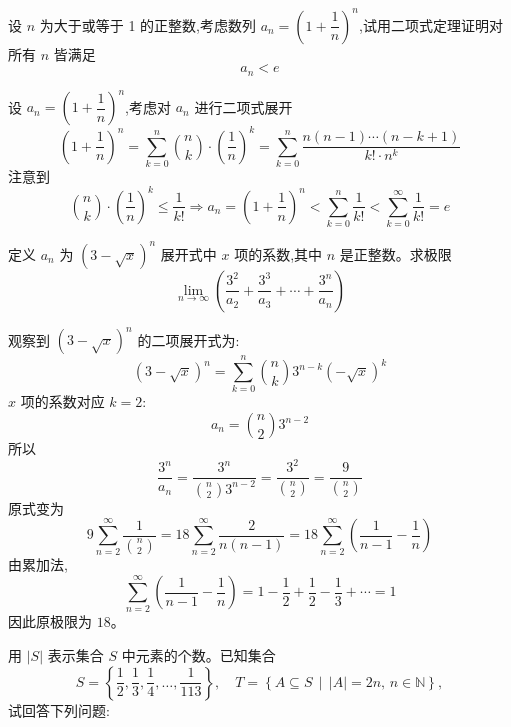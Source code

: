 \begin{questions}
    \question 设 \( n \) 为大于或等于 1 的正整数,考虑数列 \( a_n = \left(1 + \dfrac{1}{n} \right)^n\),试用二项式定理证明对所有 \( n \) 皆满足  
    \[
    a_n < e
    \]
    \begin{solution}
        设 \( a_n = \left(1 + \dfrac{1}{n} \right)^n \),考虑对 \( a_n \) 进行二项式展开
        \[
        \left(1 + \frac{1}{n} \right)^n = \sum_{k=0}^{n} \binom{n}{k} \cdot \left(\frac{1}{n}\right)^k
        = \sum_{k=0}^{n} \frac{n(n-1)\cdots(n-k+1)}{k! \cdot n^k}
        \]
        注意到
        \[
        \binom{n}{k} \cdot \left(\frac{1}{n}\right)^k \le \frac{1}{k!}
        \Rightarrow a_n=\left(1 + \frac{1}{n} \right)^n < \sum_{k=0}^{n} \frac{1}{k!} < \sum_{k=0}^{\infty} \frac{1}{k!} = e 
        \]
    \end{solution}

    \question 定义 \( a_n \) 为 \( (3 - \sqrt{x})^n \) 展开式中 \( x \) 项的系数,其中 \( n \) 是正整数。求极限  
    \[
    \lim_{n \to \infty} \left( \frac{3^2}{a_2} + \frac{3^3}{a_3} + \cdots + \frac{3^n}{a_n} \right)
    \]
    \begin{solution}
        观察到 \( (3 - \sqrt{x})^n \) 的二项展开式为:
        \[
        (3 - \sqrt{x})^n = \sum_{k=0}^n \binom{n}{k} 3^{n - k} (-\sqrt{x})^k
        \]
        \( x \) 项的系数对应 \( k = 2 \):
        \[
        a_n = \binom{n}{2} 3^{n - 2}
        \]
        所以
        \[
        \frac{3^n}{a_n} = \frac{3^n}{\binom{n}{2} 3^{n - 2}} = \frac{3^2}{\binom{n}{2}} = \frac{9}{\binom{n}{2}}
        \]
        原式变为
        \[
        9 \sum_{n=2}^{\infty} \frac{1}{\binom{n}{2}}=
        18\sum_{n=2}^{\infty} \frac{2}{n(n-1)} = 18\sum_{n=2}^{\infty} \left( \frac{1}{n-1} - \frac{1}{n} \right)
        \]
        由累加法,
        \[
        \sum_{n=2}^{\infty} \left( \frac{1}{n-1} - \frac{1}{n} \right) =  1 - \frac{1}{2} + \frac{1}{2} - \frac{1}{3} + \cdots = 1
        \]
        因此原极限为 $18$。
    \end{solution}

    \question 用 $|S|$ 表示集合 $S$ 中元素的个数。已知集合
    \[
    S = \left\{ \frac{1}{2}, \frac{1}{3}, \frac{1}{4}, \ldots, \frac{1}{113} \right\},\quad
    T = \left\{ A \subseteq S \,\middle|\, |A| = 2n,\, n \in \mathbb{N} \right\},
    \]
    试回答下列问题:
    \begin{parts}

\end{parts}
\end{questions}
